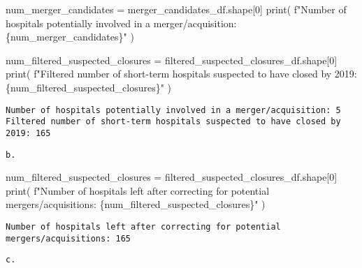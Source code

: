 \documentclass[
  letterpaper,
  DIV=11,
  numbers=noendperiod]{scrartcl}
\newenvironment{Shaded}{\begin{snugshade}}{\end{snugshade}}
\newcommand{\BuiltInTok}[1]{\textcolor[rgb]{0.00,0.23,0.31}{#1}}
\newcommand{\DecValTok}[1]{\textcolor[rgb]{0.68,0.00,0.00}{#1}}
\newcommand{\NormalTok}[1]{\textcolor[rgb]{0.00,0.23,0.31}{#1}}
\newcommand{\OperatorTok}[1]{\textcolor[rgb]{0.37,0.37,0.37}{#1}}
\newcommand{\SpecialCharTok}[1]{\textcolor[rgb]{0.37,0.37,0.37}{#1}}
\newcommand{\SpecialStringTok}[1]{\textcolor[rgb]{0.13,0.47,0.30}{#1}}
\begin{document}
\begin{Shaded}
\begin{Highlighting}[]
\NormalTok{num\_merger\_candidates }\OperatorTok{=}\NormalTok{ merger\_candidates\_df.shape[}\DecValTok{0}\NormalTok{]}
\BuiltInTok{print}\NormalTok{(}
    \SpecialStringTok{f"Number of hospitals potentially involved in a merger/acquisition: }\SpecialCharTok{\{}\NormalTok{num\_merger\_candidates}\SpecialCharTok{\}}\SpecialStringTok{"}
\NormalTok{)}

\NormalTok{num\_filtered\_suspected\_closures }\OperatorTok{=}\NormalTok{ filtered\_suspected\_closures\_df.shape[}\DecValTok{0}\NormalTok{]}
\BuiltInTok{print}\NormalTok{(}
    \SpecialStringTok{f"Filtered number of short{-}term hospitals suspected to have closed by 2019: }\SpecialCharTok{\{}\NormalTok{num\_filtered\_suspected\_closures}\SpecialCharTok{\}}\SpecialStringTok{"}
\NormalTok{)}
\end{Highlighting}
\end{Shaded}

\begin{verbatim}
Number of hospitals potentially involved in a merger/acquisition: 5
Filtered number of short-term hospitals suspected to have closed by 2019: 165
\end{verbatim}

\begin{verbatim}
b. 
\end{verbatim}

\begin{Shaded}
\begin{Highlighting}[]
\NormalTok{num\_filtered\_suspected\_closures }\OperatorTok{=}\NormalTok{ filtered\_suspected\_closures\_df.shape[}\DecValTok{0}\NormalTok{]}
\BuiltInTok{print}\NormalTok{(}
    \SpecialStringTok{f"Number of hospitals left after correcting for potential mergers/acquisitions: }\SpecialCharTok{\{}\NormalTok{num\_filtered\_suspected\_closures}\SpecialCharTok{\}}\SpecialStringTok{"}
\NormalTok{)}
\end{Highlighting}
\end{Shaded}

\begin{verbatim}
Number of hospitals left after correcting for potential mergers/acquisitions: 165
\end{verbatim}

\begin{verbatim}
c.
\end{verbatim}
\end{document}
